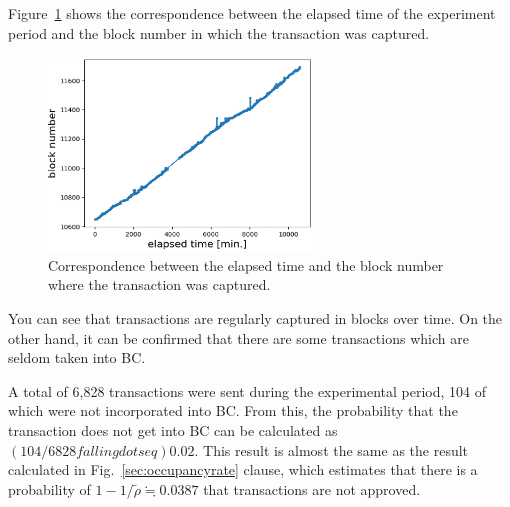 \documentclass[graybox]{svmult}
\begin{document}
Figure~\ref{fig:exp3-1} shows the correspondence between the elapsed time of the experiment period and the block number in which the transaction was captured. 
%
\begin{figure}[tb]
  \begin{center}
    \includegraphics[width=70mm]{exp3-1.eps}
  \end{center}
  \caption{Correspondence between the elapsed time and the block number where the transaction was captured.}
  \label{fig:exp3-1}
\end{figure}
%
You can see that transactions are regularly captured in blocks over time.
On the other hand, it can be confirmed that there are some transactions which are seldom taken into BC.


A total of 6,828 transactions were sent during the experimental period, 104 of which were not incorporated into BC.
From this, the probability that the transaction does not get into BC can be calculated as $(104/6828 fallingdotseq) 0.02$.
This result is almost the same as the result calculated in Fig.~\ref{sec:occupancyrate} clause, which estimates that there is a probability of $1 -1 / \tilde{\rho} \fallingdotseq 0.0387$ that transactions are not approved. 
\end{document}
